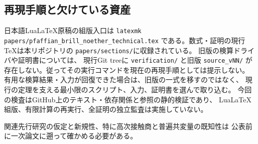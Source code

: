\subsection{再現手順と欠けている資産}
日本語LuaLaTeX原稿の組版入口は
\texttt{latexmk papers/pfaffian\_brill\_noether\_technical.tex}
である。数式・証明の現行TeXは本リポジトリの
\texttt{papers/sections/}に収録されている。
旧版の検算ドライバや証明書については、
現行Git treeに \texttt{verification/} と旧版 \texttt{source\_vNN/}
が存在しない。従ってその実行コマンドを現在の再現手順としては提示しない。
有用な検算結果・入力が回復できた場合は、旧版の一式を移すのではなく、
現行の定理を支える最小限のスクリプト、入力、証明書を選んで取り込む。
今回の検査はGitHub上のテキスト・依存関係と参照の静的検証であり、
LuaLaTeX組版、有限計算の再実行、全証明の独立監査は実施していない。

関連先行研究の仮定と新規性、特に高次接触商と普遍共変量の既知性は
公表前に一次論文に遡って確かめる必要がある。
